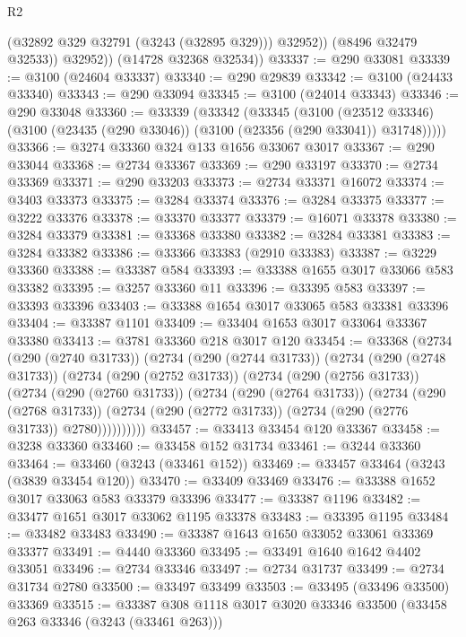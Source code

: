 \begin{lexlean}{R2}
\begin{coremodule}
                (@32892 @329 @32791 (@3243 (@32895 @329)))
                @32952))
            (@8496 @32479 @32533))
          @32952))
      (@14728 @32368 @32534))
@33337 := @290 @33081
@33339 := @3100 (@24604 @33337)
@33340 := @290 @29839
@33342 := @3100 (@24433 @33340)
@33343 := @290 @33094
@33345 := @3100 (@24014 @33343)
@33346 := @290 @33048
@33360 := @33339
    (@33342
      (@33345
        (@3100
          (@23512 @33346)
          (@3100 (@23435 (@290 @33046)) (@3100 (@23356 (@290 @33041)) @31748)))))
@33366 := @3274 @33360 @324 @133 @1656 @33067 @3017
@33367 := @290 @33044
@33368 := @2734 @33367
@33369 := @290 @33197
@33370 := @2734 @33369
@33371 := @290 @33203
@33373 := @2734 @33371 @16072
@33374 := @3403 @33373
@33375 := @3284 @33374
@33376 := @3284 @33375
@33377 := @3222 @33376
@33378 := @33370 @33377
@33379 := @16071 @33378
@33380 := @3284 @33379
@33381 := @33368 @33380
@33382 := @3284 @33381
@33383 := @3284 @33382
@33386 := @33366 @33383 (@2910 @33383)
@33387 := @3229 @33360
@33388 := @33387 @584
@33393 := @33388 @1655 @3017 @33066 @583 @33382
@33395 := @3257 @33360 @11
@33396 := @33395 @583
@33397 := @33393 @33396
@33403 := @33388 @1654 @3017 @33065 @583 @33381 @33396
@33404 := @33387 @1101
@33409 := @33404 @1653 @3017 @33064 @33367 @33380
@33413 := @3781 @33360 @218 @3017 @120
@33454 := @33368
    (@2734
      (@290 (@2740 @31733))
      (@2734
        (@290 (@2744 @31733))
        (@2734
          (@290 (@2748 @31733))
          (@2734
            (@290 (@2752 @31733))
            (@2734
              (@290 (@2756 @31733))
              (@2734
                (@290 (@2760 @31733))
                (@2734
                  (@290 (@2764 @31733))
                  (@2734
                    (@290 (@2768 @31733))
                    (@2734 (@290 (@2772 @31733)) (@2734 (@290 (@2776 @31733)) @2780))))))))))
@33457 := @33413 @33454 @120 @33367
@33458 := @3238 @33360
@33460 := @33458 @152 @31734
@33461 := @3244 @33360
@33464 := @33460 (@3243 (@33461 @152))
@33469 := @33457 @33464 (@3243 (@3839 @33454 @120))
@33470 := @33409 @33469
@33476 := @33388 @1652 @3017 @33063 @583 @33379 @33396
@33477 := @33387 @1196
@33482 := @33477 @1651 @3017 @33062 @1195 @33378
@33483 := @33395 @1195
@33484 := @33482 @33483
@33490 := @33387 @1643 @1650 @33052 @33061 @33369 @33377
@33491 := @4440 @33360
@33495 := @33491 @1640 @1642 @4402 @33051
@33496 := @2734 @33346
@33497 := @2734 @31737
@33499 := @2734 @31734 @2780
@33500 := @33497 @33499
@33503 := @33495 (@33496 @33500) @33369
@33515 := @33387 @308 @1118 @3017 @3020 @33346 @33500 (@33458 @263 @33346 (@3243 (@33461 @263)))

\end{coremodule}
\end{lexlean}

